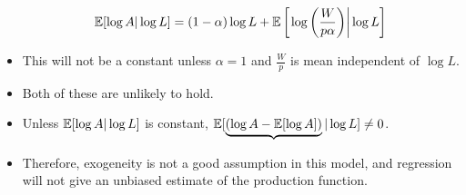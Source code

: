 \begin{frame}[allowframebreaks]
\begin{itemize}
\begin{align*}
  \mathbb{E}[ \log A | \log L ] =  (1-\alpha) \log L +
  \mathbb{E}\left[\left . \log\left(\frac{W}{p \alpha }\right) \right| \log L
  \right] 
\end{align*}
\item This will not be a constant unless $\alpha = 1$ and $\frac{W}{p}$ is
mean independent of $\log L$. 
\item Both of these are unlikely to
hold. 
\item Unless $\mathbb{E}[ \log A | \log L ] $ is constant,
$\mathbb{E}[\underbrace{(\log{A} - \mathbb{E}[\log A])}|\log L] \neq 0$.  
\item Therefore,
exogeneity is not a good assumption in this model, and regression will
not give an unbiased estimate of the production function. 

\end{itemize}
\end{frame}

